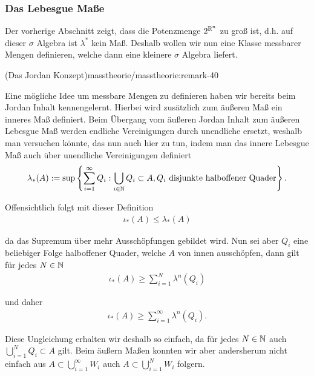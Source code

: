 \subsubsection{Das Lebesgue Maße}
\label{\detokenize{masstheorie/masstheorie:das-lebesgue-masze}}
\par
Der vorherige Abschnitt zeigt, dass die Potenzmenge \(2^{\mathbb{R}^n}\) zu groß ist, d.h. auf dieser \(\sigma\) Algebra ist \(\lambda^\ast\) kein Maß. Deshalb wollen wir nun eine Klasse messbarer Mengen definieren, welche dann eine kleinere \(\sigma\) Algebra liefert.
\begin{remark}{(Das Jordan Konzept)}{masstheorie/masstheorie:remark-40}



\par
Eine mögliche Idee um messbare Mengen zu definieren haben wir bereits beim Jordan Inhalt kennengelernt. Hierbei wird zusätzlich zum äußeren Maß ein inneres Maß definiert. Beim Übergang vom äußeren Jordan Inhalt zum äußeren Lebesgue Maß werden endliche Vereinigungen durch unendliche ersetzt, weshalb man versuchen könnte, das nun auch hier zu tun, indem man das innere Lebesgue Maß auch über unendliche Vereinigungen definiert
\begin{align*}
\lambda_\ast(A) := \sup\left\{\sum_{i=1}^\infty Q_i: \bigcup_{i\in\mathbb{N}} Q_i \subset A, Q_i\text{ disjunkte halboffener Quader}\right\}.
\end{align*}
\par
Offensichtlich folgt mit dieser Definition
\begin{align*}
\iota_\ast(A)\leq \lambda_\ast(A)
\end{align*}
\par
da das Supremum über mehr Ausschöpfungen gebildet wird. Nun sei aber \(Q_i\) eine beliebiger Folge halboffener Quader, welche \(A\) von innen ausschöpfen, dann gilt für jedes \(N\in\mathbb{N}\)
\begin{align*}
\iota_\ast(A) \geq \sum_{i=1}^N \lambda^n(Q_i)
\end{align*}
\par
und daher
\begin{align*}
\iota_\ast(A)\geq \sum_{i=1}^\infty \lambda^n(Q_i).
\end{align*}
\par
Diese Ungleichung erhalten wir deshalb so einfach, da für jedes \(N\in\mathbb{N}\) auch \(\bigcup_{i=1}^N Q_i\subset A\) gilt. Beim äußern Maßen konnten wir aber andersherum nicht einfach aus \(A\subset \bigcup_{i=1}^\infty W_i\) auch \(A\subset \bigcup_{i=1}^N W_i\) folgern.


\end{remark}
